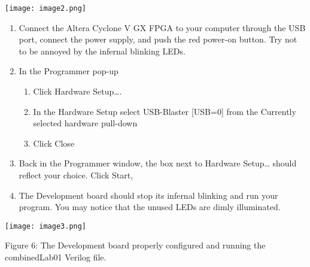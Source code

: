 \texttt{[image: image2.png]}

\begin{enumerate}
\def\labelenumi{\arabic{enumi}.}
\setcounter{enumi}{14}
\item
  Connect the Altera Cyclone V GX FPGA to your computer through the USB
  port, connect the power supply, and push the red power-on button. Try
  not to be annoyed by the infernal blinking LEDs.
\item
  In the Programmer pop-up

  \begin{enumerate}
  \def\labelenumii{\alph{enumii}.}
  \item
    Click Hardware Setup\ldots.
  \item
    In the Hardware Setup select USB-Blaster {[}USB=0{]} from the
    Currently selected hardware pull-down
  \item
    Click Close
  \end{enumerate}
\item
  Back in the Programmer window, the box next to Hardware Setup\ldots{}
  should reflect your choice. Click Start,
\item
  The Development board should stop its infernal blinking and run your
  program. You may notice that the unused LEDs are dimly illuminated.
\end{enumerate}

\texttt{[image: image3.png]}

Figure 6: The Development board properly configured and running the
combinedLab01 Verilog file.


